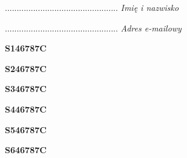 \begin{turn}{90}\begin{minipage}{\linewidth} \vspace{20mm} ................................................  \textit{Imię i nazwisko}\end{minipage}\end{turn}

\begin{turn}{90}\begin{minipage}{\linewidth} \vspace{20mm} ................................................  \textit{Adres e-mailowy}\end{minipage}\end{turn}

\begin{turn}{90}\huge \begin{minipage}{\linewidth} \vspace{10mm}\textbf{S146787C}\end{minipage}\end{turn}

\begin{turn}{90}\huge \begin{minipage}{\linewidth} \vspace{10mm}\textbf{S246787C}\end{minipage}\end{turn}

\begin{turn}{90}\huge \begin{minipage}{\linewidth} \vspace{10mm}\textbf{S346787C}\end{minipage}\end{turn}

\begin{turn}{90}\huge \begin{minipage}{\linewidth} \vspace{10mm}\textbf{S446787C}\end{minipage}\end{turn}

\begin{turn}{90}\huge \begin{minipage}{\linewidth} \vspace{10mm}\textbf{S546787C}\end{minipage}\end{turn}

\begin{turn}{90}\huge \begin{minipage}{\linewidth} \vspace{10mm}\textbf{S646787C}\end{minipage}\end{turn}

